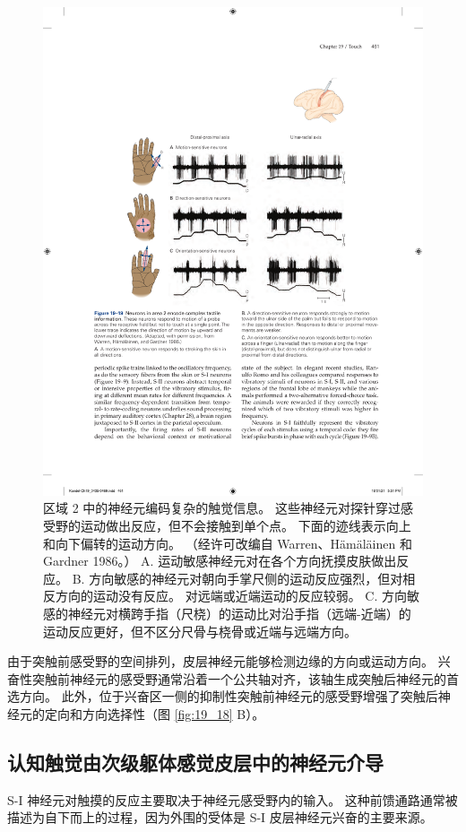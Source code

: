 \begin{figure}[htbp]
	\centering
	\includegraphics[width=1.0\linewidth]{chap19/fig_19_19}
	\caption{区域 2 中的神经元编码复杂的触觉信息。 
		这些神经元对探针穿过感受野的运动做出反应，但不会接触到单个点。 
		下面的迹线表示向上和向下偏转的运动方向。 （经许可改编自 Warren、Hämäläinen 和 Gardner 1986。） 
		A. 运动敏感神经元对在各个方向抚摸皮肤做出反应。 
		B. 方向敏感的神经元对朝向手掌尺侧的运动反应强烈，但对相反方向的运动没有反应。 对远端或近端运动的反应较弱。 
		C. 方向敏感的神经元对横跨手指（尺桡）的运动比对沿手指（远端-近端）的运动反应更好，但不区分尺骨与桡骨或近端与远端方向。}
	\label{fig:19_19}
\end{figure}

由于突触前感受野的空间排列，皮层神经元能够检测边缘的方向或运动方向。 
兴奋性突触前神经元的感受野通常沿着一个公共轴对齐，该轴生成突触后神经元的首选方向。 
此外，位于兴奋区一侧的抑制性突触前神经元的感受野增强了突触后神经元的定向和方向选择性（图 \ref{fig:19_18} B）。


\subsection{认知触觉由次级躯体感觉皮层中的神经元介导}
S-I 神经元对触摸的反应主要取决于神经元感受野内的输入。 
这种前馈通路通常被描述为自下而上的过程，因为外围的受体是 S-I 皮层神经元兴奋的主要来源。



